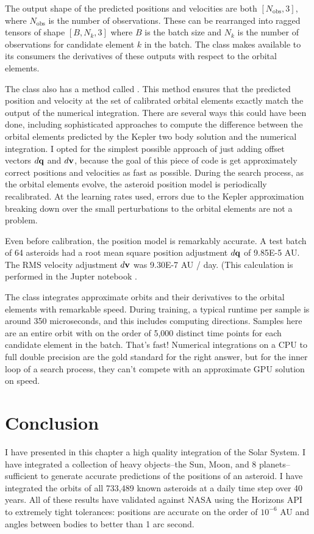 The output shape of the predicted positions and velocities are both $[N_{\mathrm{obs}}, 3]$, where $N_{\mathrm{obs}}$ is the number of observations.
These can be rearranged into ragged tensors of shape $[B, N_{k}, 3]$ where $B$ is the batch size and $N_{k}$ is the number of observations for 
candidate element $k$ in the batch.
The class makes available to its consumers the derivatives of these outputs with respect to the orbital elements.

The  class also has a method called .
This method ensures that the predicted position and velocity at the set of calibrated orbital elements exactly match the output of the numerical integration.
There are several ways this could have been done, including sophisticated approaches to compute 
the difference between the orbital elements predicted by the Kepler two body solution and the numerical integration.
I opted for the simplest possible approach of just adding offset vectors $d \mathbf{q}$ and $d \mathbf{v}$,
because the goal of this piece of code is get approximately correct positions and velocities as fast as possible.
During the search process, as the orbital elements evolve, the asteroid position model is periodically recalibrated.
At the learning rates used, errors due to the Kepler approximation breaking down over the small perturbations to the orbital elements are not a problem.

Even before calibration, the position model is remarkably accurate.
A test batch of 64 asteroids had a root mean square position adjustment $d \mathbf{q}$ of 9.85E-5 AU.
The RMS velocity adjustment $d \mathbf{v}$ was 9.30E-7 AU / day.
(This calculation is performed in the Jupter notebook .

The  class integrates approximate orbits and their derivatives to the orbital elements with remarkable speed.
During training, a typical runtime per sample is around 350 microseconds, and this includes computing directions.
Samples here are an entire orbit with on the order of 5,000 distinct time points for each candidate element in the batch.
That's fast! 
Numerical integrations on a CPU to full double precision are the gold standard for the right answer, 
but for the inner loop of a search process, they can't compete with an approximate GPU solution on speed.

\section{Conclusion}
\label{section_conclusion}
I have presented in this chapter a high quality integration of the Solar System.
I have integrated a collection of heavy objects--the Sun, Moon, and 8 planets--sufficient to generate accurate predictions of the positions of an asteroid.
I have integrated the orbits of all 733,489 known asteroids at a daily time step over 40 years.
All of these results have validated against NASA using the Horizons API to extremely tight tolerances:
positions are accurate on the order of $10^{-6}$ AU and angles between bodies to better than 1 arc second.

